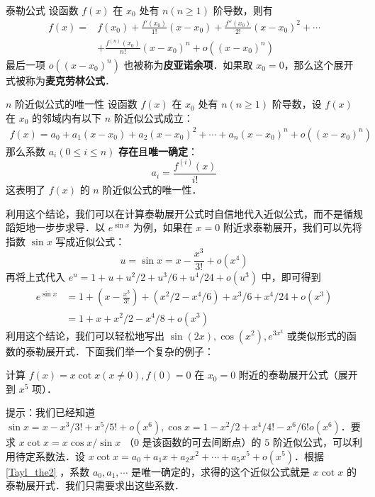 
\begin{theorem}{泰勒公式}\label{Tayl_the1}
设函数 $f(x)$ 在 $x_0$ 处有 $n(n\ge 1)$ 阶导数，则有
\begin{equation}\label{Tayl_eq2}
\begin{aligned}
f(x)=&f(x_0)+\frac{f'(x_0)}{1!}(x-x_0)+\frac{f''(x_0)}{2!}(x-x_0)^2+\cdots\\
&+\frac{f^{(n)}(x_0)}{n!}(x-x_0)^n+o((x-x_0)^n)
\end{aligned}
\end{equation}
最后一项 $o((x-x_0)^n)$ 也被称为\textbf{皮亚诺余项}．如果取 $x_0=0$，那么这个展开式被称为\textbf{麦克劳林公式}．
\end{theorem}
\begin{theorem}{$n$ 阶近似公式的唯一性}\label{Tayl_the2}
设函数 $f(x)$ 在 $x_0$ 处有 $n(n\ge 1)$ 阶导数，设 $f(x)$ 在 $x_0$ 的邻域内有以下 $n$ 阶近似公式成立：
\begin{equation}
\begin{aligned}
f(x)=a_0+a_1(x-x_0)+a_2(x-x_0)^2+\cdots+a_n(x-x_0)^n+o((x-x_0)^n)
\end{aligned}
\end{equation}
那么系数 $a_i(0\le i\le n)$ \textbf{存在}且\textbf{唯一确定}：
\begin{equation}
a_i=\frac{f^{(i)}(x)}{i!}
\end{equation}
这表明了 $f(x)$ 的 $n$ 阶近似公式的唯一性．
\end{theorem}
利用这个结论，我们可以在计算泰勒展开公式时自信地代入近似公式，而不是循规蹈矩地一步步求导．以 $e^{\sin x}$ 为例，如果在 $x=0$ 附近求泰勒展开，我们可以先将指数 $\sin x$ 写成近似公式：
\begin{equation}
u=\sin x=x-\frac{x^3}{3!}+o(x^4)
\end{equation}
再将上式代入 $e^u=1+u+u^2/2+u^3/6+u^4/24+o(u^3)$ 中，即可得到
\begin{equation}
\begin{aligned}
e^{\sin x}&=1+(x-\frac{x^3}{3!})+(x^2/2-x^4/6)+x^3/6+x^4/24+o(x^3)
\\&=1+x+x^2/2-x^4/8+o(x^3)
\end{aligned}
\end{equation}
利用这个结论，我们可以轻松地写出 $\sin (2x),\cos(x^2),e^{3x^3}$ 或类似形式的函数的泰勒展开式．下面我们举一个复杂的例子：
\begin{exercise}{}
计算 $f(x)=x\cot x(x\neq 0),f(0)=0$ 在 $x_0=0$ 附近的泰勒展开公式（展开到 $x^5$ 项）．
\end{exercise}
提示：我们已经知道 $\sin x=x-x^3/3!+x^5/5!+o(x^6),\cos x=1-x^2/2+x^4/4!-x^6/6!o(x^6)$．要求 $x\cot x=x\cos x/\sin x$ （$0$ 是该函数的可去间断点）的 $5$ 阶近似公式，可以利用待定系数法．设 $x\cot x=a_0+a_1 x+a_2 x^2+\cdots+ a_5 x^5 + o(x^5)$．根据 \autoref{Tayl_the2}  ，系数 $a_0,a_1,\cdots$ 是唯一确定的，求得的这个近似公式就是 $x\cot x$ 的泰勒展开式．我们只需要求出这些系数．

